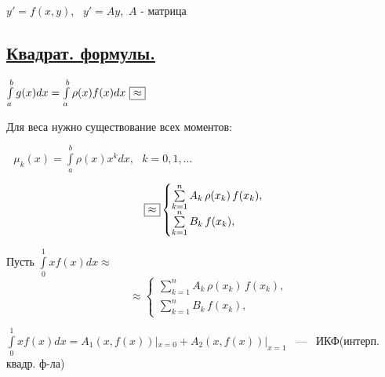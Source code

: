 \documentclass[12pt]{article}
\begin{document}
$y' = f(x,y)$, \ $y' = Ay$,\ $A$ - матрица


\begin{center}
\section*{\underline{Квадрат. формулы.}}
\end{center}

$\int\limits_a^b g(x)dx = \int\limits_a^b \rho(x)f(x)dx \ \fbox{$\approx$}$



Для веса нужно существование всех моментов:

$\ \ \ \mu_k(x) = \int\limits_a^b \rho(x)x^kdx, \ \ \ k = 0, 1,\ldots$


\begin{equation*}
\quad \fbox{$\approx$}
 \begin{cases}
   \sum\limits_{k=1}^n A_k \, \rho(x_k) \, f(x_k),
   \\
   \sum\limits_{k=1}^n B_k \, f(x_k),
 \end{cases}
\end{equation*}


Пусть $\int\limits_0^1 xf(x)dx \approx$
\begin{equation*}
\quad \approx
 \begin{cases}
   \sum\limits_{k=1}^n A_k \, \rho(x_k) \, f(x_k),
   \\
   \sum\limits_{k=1}^n B_k \, f(x_k),
 \end{cases}
\end{equation*}

$\int\limits_0^1 xf(x)dx = A_1(x, f(x))|_{x=0} +  A_2(x, f(x))|_{x=1}$ \ --- \ ИКФ(интерп. квадр. ф-ла)
\end{document}
